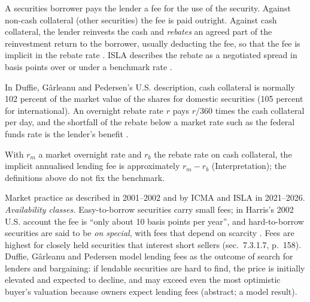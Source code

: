 \begin{qfdefinition}\label{def:securities-lending-fee-rebate}
 A securities borrower pays the lender a fee for the use of the security. Against non-cash collateral (other securities) the fee is paid outright. Against cash collateral, the lender reinvests the cash and \emph{rebates} an agreed part of the reinvestment return to the borrower, usually deducting the fee, so that the fee is implicit in the rebate rate \citep[Repo FAQ 13]{al-icma}. ISLA describes the rebate as a negotiated spread in basis points over or under a benchmark rate \citep[``Cash Rebate'', pp.~7--8]{al-isla}.

In Duffie, Gârleanu and Pedersen's U.S. description, cash collateral is normally 102 percent of the market value of the shares for domestic securities (105 percent for international). An overnight rebate rate $r$ pays $r/360$ times the cash collateral per day, and the shortfall of the rebate below a market rate such as the federal funds rate is the lender's benefit \citep[sec.~2, p.~7]{al-duffie}.

With $r_m$ a market overnight rate and $r_b$ the rebate rate on cash collateral, the implicit annualised lending fee is approximately $r_m-r_b$ (Interpretation); the definitions above do not fix the benchmark.

 Market practice as described in 2001--2002 and by ICMA and ISLA in 2021--2026. \emph{Availability classes.} Easy-to-borrow securities carry small fees; in Harris's 2002 U.S. account the fee is ``only about 10 basis points per year'', and hard-to-borrow securities are said to be \emph{on special}, with fees that depend on scarcity \citep[sec.~7.3.1.4, pp.~156--157]{alpha-harris}. Fees are highest for closely held securities that interest short sellers (sec.~7.3.1.7, p.~158). Duffie, Gârleanu and Pedersen model lending fees as the outcome of search for lenders and bargaining: if lendable securities are hard to find, the price is initially elevated and expected to decline, and may exceed even the most optimistic buyer's valuation because owners expect lending fees (abstract; a model result).


\end{qfdefinition}
